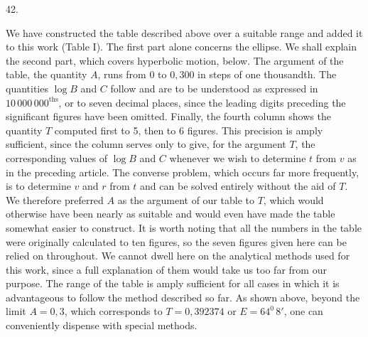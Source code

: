 \begin{center}
42.
\end{center}
We have constructed the table described above over a suitable range and added it to this work (Table I). The first part alone concerns the ellipse. We shall explain the second part, which covers hyperbolic motion, below. The argument of the table, the quantity $A$, runs from $0$ to $0{,}300$ in steps of one thousandth. The quantities $\log B$ and $C$ follow and are to be understood as expressed in $10\,000\,000^{\mathrm{ths}}$, or to seven decimal places, since the leading digits preceding the significant figures have been omitted. Finally, the fourth column shows the quantity $T$ computed first to 5, then to 6 figures. This precision is amply sufficient, since the column serves only to give, for the argument $T$, the corresponding values of $\log B$ and $C$ whenever we wish to determine $t$ from $v$ as in the preceding article. The converse problem, which occurs far more frequently, is to determine $v$ and $r$ from $t$ and can be solved entirely without the aid of $T$. We therefore preferred $A$ as the argument of our table to $T$, which would otherwise have been nearly as suitable and would even have made the table somewhat easier to construct. It is worth noting that all the numbers in the table were originally calculated to ten figures, so the seven figures given here can be relied on throughout. We cannot dwell here on the analytical methods used for this work, since a full explanation of them would take us too far from our purpose. The range of the table is amply sufficient for all cases in which it is advantageous to follow the method described so far. As shown above, beyond the limit $A=0{,}3$, which corresponds to $T=0{,}392374$ or $E=64^0\,8'$, one can conveniently dispense with special methods.
